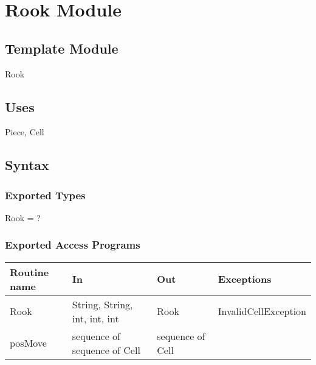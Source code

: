 \documentclass[12pt]{article}
\begin{document}
\newpage









































\section* {Rook Module}

\subsection*{Template Module}

Rook 

\subsection* {Uses}

Piece, Cell

\subsection* {Syntax}

\subsubsection* {Exported Types}

Rook = ?

\subsubsection* {Exported Access Programs}

\begin{tabular}{| l | l | l | l |}
\hline
\textbf{Routine name} & \textbf{In} & \textbf{Out} & \textbf{Exceptions}\\
\hline
Rook &String, String, int, int, int & Rook &InvalidCellException\\
\hline
posMove & sequence of sequence of Cell & sequence of Cell & ~\\
\hline
\end{tabular}
\end{document}
